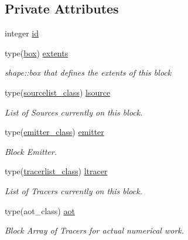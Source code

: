\subsection*{Private Attributes}
\begin{DoxyCompactItemize}
\item 
integer \mbox{\hyperlink{structblocks__mod_1_1block__class_addd1a493d56aa1ffd1bc27c56b682065}{id}}
\item 
type(\mbox{\hyperlink{structgeometry__mod_1_1box}{box}}) \mbox{\hyperlink{structblocks__mod_1_1block__class_aff3b0cb7d8248f8a87691a028de916d3}{extents}}
\begin{DoxyCompactList}\small\item\em shape\+::box that defines the extents of this block \end{DoxyCompactList}\item 
type(\mbox{\hyperlink{structsources__list__mod_1_1sourcelist__class}{sourcelist\+\_\+class}}) \mbox{\hyperlink{structblocks__mod_1_1block__class_a2f4d63afb2696e2728f20a99e26a4b18}{lsource}}
\begin{DoxyCompactList}\small\item\em List of Sources currently on this block. \end{DoxyCompactList}\item 
type(\mbox{\hyperlink{structemitter__mod_1_1emitter__class}{emitter\+\_\+class}}) \mbox{\hyperlink{structblocks__mod_1_1block__class_a55e85183ba871abcaba1c00d5393611f}{emitter}}
\begin{DoxyCompactList}\small\item\em Block Emitter. \end{DoxyCompactList}\item 
type(\mbox{\hyperlink{structtracer__list__mod_1_1tracerlist__class}{tracerlist\+\_\+class}}) \mbox{\hyperlink{structblocks__mod_1_1block__class_ab4e2108886a09ba919d01474503f6165}{ltracer}}
\begin{DoxyCompactList}\small\item\em List of Tracers currently on this block. \end{DoxyCompactList}\item 
type(aot\+\_\+class) \mbox{\hyperlink{structblocks__mod_1_1block__class_a53f912fe57eb5e386ca62b1dbd087417}{aot}}
\begin{DoxyCompactList}\small\item\em Block Array of Tracers for actual numerical work. \end{DoxyCompactList}\item 

\end{DoxyCompactItemize}
